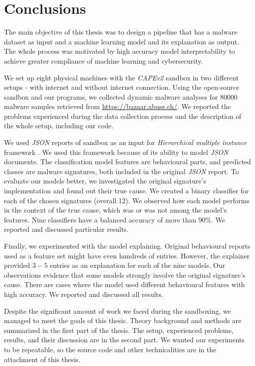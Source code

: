 \chapter{Conclusions} \label{chap:concl}
The main objective of this thesis was to design a pipeline that has a malware dataset as input and a machine learning model and its explanation as output. The whole process was motivated by high accuracy model interpretability to achieve greater compliance of machine learning and cybersecurity.

We set up eight physical machines with the \emph{CAPEv2} sandbox in two different setups - with internet and without internet connection. Using the open-source sandbox and our programs, we collected dynamic malware analyses for $80 000$ malware samples retrieved from \url{https://bazaar.abuse.ch/}. We reported the problems experienced during the data collection process and the description of the whole setup, including our code.

We used \emph{JSON} reports of sandbox as an input for \emph{Hierarchical multiple instance} framework \cite{Mandlik2020}. We used this framework because of its ability to model \emph{JSON} documents. The classification model features are behavioural parts, and predicted classes are malware signatures, both included in the original \emph{JSON} report. 
To evaluate our models better, we investigated the original signature's implementation and found out their true cause. We created a binary classifier for each of the chosen signatures (overall 12). We observed how each model performs in the context of the true cause, which was or was not among the model's features. Nine classifiers have a balanced accuracy of more than $90\%$. We reported and discussed particular results.

Finally, we experimented with the model explaining. Original behavioural reports used as a feature set might have even hundreds of entries. However, the explainer provided $3-5$ entries as an explanation for each of the nine models. Our observations evidence that some models strongly involve the original signature's cause. There are cases where the model used different behavioural features with high accuracy. We reported and discussed all results.

Despite the significant amount of work we faced during the sandboxing, we managed to meet the goals of this thesis. Theory background and methods are summarized in the first part of the thesis. The setup, experienced problems, results, and their discussion are in the second part. We wanted our experiments to be repeatable, so the source code and other technicalities are in the attachment of this thesis.

